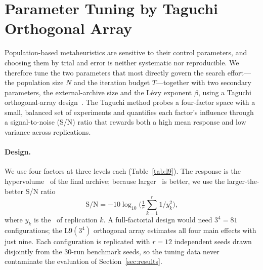 \section{Parameter Tuning by Taguchi Orthogonal Array}
\label{sec:taguchi}

Population-based metaheuristics are sensitive to their control parameters, and choosing them by trial and error is neither systematic nor reproducible. We therefore tune the two parameters that most directly govern the search effort---the population size $N$ and the iteration budget $T$---together with two secondary parameters, the external-archive size and the Lévy exponent $\beta$, using a Taguchi orthogonal-array design~\cite{montgomery}. The Taguchi method probes a four-factor space with a small, balanced set of experiments and quantifies each factor's influence through a signal-to-noise (S/N) ratio that rewards both a high mean response and low variance across replications.

\paragraph{Design.}
We use four factors at three levels each (Table~\ref{tab:l9}). The response is the hypervolume \HV\ of the final archive; because larger \HV\ is better, we use the larger-the-better S/N ratio
\begin{equation}
\mathrm{S/N} = -10\log_{10}\!\Big(\tfrac{1}{r}\textstyle\sum_{k=1}^{r} 1/y_k^{2}\Big),
\label{eq:sn}
\end{equation}
where $y_k$ is the \HV\ of replication $k$. A full-factorial design would need $3^4=81$ configurations; the L9$(3^4)$ orthogonal array estimates all four main effects with just nine. Each configuration is replicated with $r=12$ independent seeds drawn disjointly from the 30-run benchmark seeds, so the tuning data never contaminate the evaluation of Section~\ref{sec:results}.

